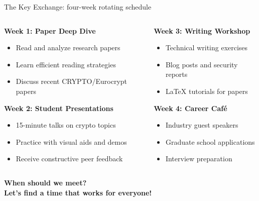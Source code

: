 \documentclass[aspectratio=169, lualatex, handout]{beamer}
\begin{document}
\begin{frame}{The Key Exchange: four-week rotating schedule}
	\begin{columns}[c]
		\begin{column}{0.5\textwidth}
			\textbf{Week 1: Paper Deep Dive}
			\begin{itemize}
				\item Read and analyze research papers
				\item Learn efficient reading strategies
				\item Discuss recent CRYPTO/Eurocrypt papers
			\end{itemize}
			\vspace{0.3cm}
			\textbf{Week 2: Student Presentations}
			\begin{itemize}
				\item 15-minute talks on crypto topics
				\item Practice with visual aids and demos
				\item Receive constructive peer feedback
			\end{itemize}
		\end{column}
		\begin{column}{0.5\textwidth}
			\textbf{Week 3: Writing Workshop}
			\begin{itemize}
				\item Technical writing exercises
				\item Blog posts and security reports
				\item LaTeX tutorials for papers
			\end{itemize}
			\vspace{0.3cm}
			\textbf{Week 4: Career Café}
			\begin{itemize}
				\item Industry guest speakers
				\item Graduate school applications
				\item Interview preparation
			\end{itemize}
		\end{column}
	\end{columns}
	\vspace{0.1cm}
	\begin{center}
		\Large\textcolor{cipherprimary}{\textbf{When should we meet? \\ Let's find a time that works for everyone!}}
	\end{center}
\end{frame}
\end{document}
